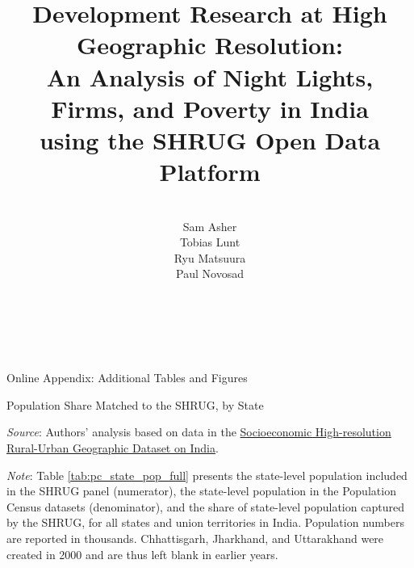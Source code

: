 \documentclass[12pt,letterpaper]{article}
\title{Development Research at High Geographic Resolution: \\ An
  Analysis of Night Lights, Firms, and Poverty in India \\ using the
  SHRUG Open Data Platform}
\author{ \\ Sam Asher \\ Tobias Lunt \\ Ryu Matsuura \\ Paul Novosad \\ }
\newcommand{\shrugpath}{.}
\begin{document}
\date{}
\maketitle \\ \\

\begin{center}
{\large Online Appendix: Additional Tables and Figures}
\end{center}

\begin{appendix}


\clearpage
\setcounter{pag}{1} \doublespacing

\setcounter{table}{0}
\renewcommand{\thetable}{S\arabic{table}}
\setcounter{figure}{0}
\renewcommand{\thefigure}{S\arabic{figure}}


  \begin{table}[H]
    \caption{Population Share Matched to the SHRUG, by State} 
    \vspace{-5mm}

    \begin{center}
      \tiny{}
    \end{center}

    \footnotesize \item \textit{Source}: Authors' analysis based on data in the \href{http://www.devdatalab.org/shrug}{Socioeconomic High-resolution
    Rural-Urban Geographic Dataset on India}.
     \item \textit{Note}: Table \ref{tab:pc_state_pop_full} presents the state-level
       population included in the SHRUG panel (numerator), the
       state-level population in the Population Census datasets
       (denominator), and the share of state-level population captured
       by the SHRUG, for all states and union territories in
       India. Population numbers are reported in
       thousands. Chhattisgarh, Jharkhand, and Uttarakhand were
       created in 2000 and are thus left blank in earlier years.

    \label{tab:pc_state_pop_full}
  \end{table}


\end{appendix}
\end{document}
